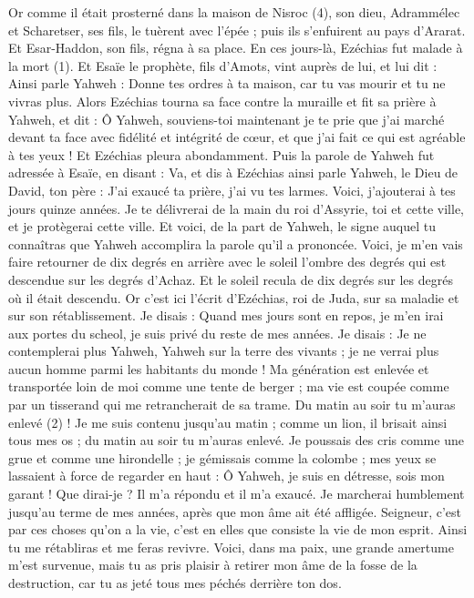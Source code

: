 \begin{multicols}{2}
{Or comme il était prosterné dans la maison de Nisroc (4), son dieu, Adrammélec et Scharetser, ses fils, le tuèrent avec l'épée ; puis ils s’enfuirent au pays d'Ararat. Et Esar-Haddon, son fils, régna à sa place.
\VerseOne{}En ces jours-là, Ezéchias fut malade à la mort (1). Et Esaïe le prophète, fils d'Amots, vint auprès de lui, et lui dit : Ainsi parle Yahweh : Donne tes ordres à ta maison, car tu vas mourir et tu ne vivras plus.
Alors Ezéchias tourna sa face contre la muraille et fit sa prière à Yahweh,
et dit : Ô Yahweh, souviens-toi maintenant je te prie que j'ai marché devant ta face avec fidélité et intégrité de cœur, et que j'ai fait ce qui est agréable à tes yeux ! Et Ezéchias pleura abondamment.
Puis la parole de Yahweh fut adressée à Esaïe, en disant :
Va, et dis à Ezéchias ainsi parle Yahweh, le Dieu de David, ton père : J'ai exaucé ta prière, j'ai vu tes larmes. Voici, j’ajouterai à tes jours quinze années.
Je te délivrerai de la main du roi d’Assyrie, toi et cette ville, et je protègerai cette ville.
Et voici, de la part de Yahweh, le signe auquel tu connaîtras que Yahweh accomplira la parole qu'il a prononcée.
Voici, je m’en vais faire retourner de dix degrés en arrière avec le soleil l'ombre des degrés qui est descendue sur les degrés d'Achaz. Et le soleil recula de dix degrés sur les degrés où il était descendu.
Or c'est ici l'écrit d'Ezéchias, roi de Juda, sur sa maladie et sur son rétablissement.
Je disais : Quand mes jours sont en repos, je m'en irai aux portes du scheol, je suis privé du reste de mes années.
Je disais : Je ne contemplerai plus Yahweh, Yahweh sur la terre des vivants ; je ne verrai plus aucun homme parmi les habitants du monde !
Ma génération est enlevée et transportée loin de moi comme une tente de berger ; ma vie est coupée comme par un tisserand qui me retrancherait de sa trame. Du matin au soir tu m'auras enlevé (2) !
Je me suis contenu jusqu'au matin ; comme un lion, il brisait ainsi tous mes os ; du matin au soir tu m'auras enlevé.
Je poussais des cris comme une grue et comme une hirondelle ; je gémissais comme la colombe ; mes yeux se lassaient à force de regarder en haut : Ô Yahweh, je suis en détresse, sois mon garant !
Que dirai-je ? Il m'a répondu et il m’a exaucé. Je marcherai humblement jusqu’au terme de mes années, après que mon âme ait été affligée.
Seigneur, c’est par ces choses qu’on a la vie, c’est en elles que consiste la vie de mon esprit. Ainsi tu me rétabliras et me feras revivre.
Voici, dans ma paix, une grande amertume m’est survenue, mais tu as pris plaisir à retirer mon âme de la fosse de la destruction, car tu as jeté tous mes péchés derrière ton dos.
}
\end{multicols}
